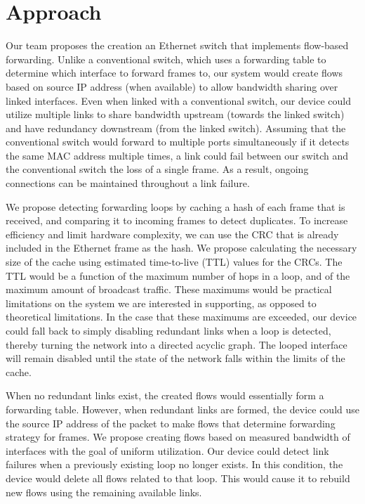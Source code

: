 \section{Approach}
\label{sec:approach}
    Our team proposes the creation an Ethernet switch that implements flow-based forwarding.
    Unlike a conventional switch, which uses a forwarding table to determine which interface to forward frames to, our system would create flows based on source IP address (when available) to allow bandwidth sharing over linked interfaces.
    Even when linked with a conventional switch, our device could utilize multiple links to share bandwidth upstream (towards the linked switch) and have redundancy downstream (from the linked switch).
    Assuming that the conventional switch would forward to multiple ports simultaneously if it detects the same MAC address multiple times, a link could fail between our switch and the conventional switch the loss of a single frame.
    As a result, ongoing connections can be maintained throughout a link failure.

    We propose detecting forwarding loops by caching a hash of each frame that is received, and comparing it to incoming frames to detect duplicates.
    To increase efficiency and limit hardware complexity, we can use the CRC that is already included in the Ethernet frame as the hash.
    We propose calculating the necessary size of the cache using estimated time-to-live (TTL) values for the CRCs.
    The TTL would be a function of the maximum number of hops in a loop, and of the maximum amount of broadcast traffic.
    These maximums would be practical limitations on the system we are interested in supporting, as opposed to theoretical limitations.
    In the case that these maximums are exceeded, our device could fall back to simply disabling redundant links when a loop is detected, thereby turning the network into a directed acyclic graph.
    The looped interface will remain disabled until the state of the network falls within the limits of the cache.

    When no redundant links exist, the created flows would essentially form a forwarding table.
    However, when redundant links are formed, the device could use the source IP address of the packet to make flows that determine forwarding strategy for frames.
    We propose creating flows based on measured bandwidth of interfaces with the goal of uniform utilization.
    Our device could detect link failures when a previously existing loop no longer exists.
    In this condition, the device would delete all flows related to that loop.
    This would cause it to rebuild new flows using the remaining available links.

